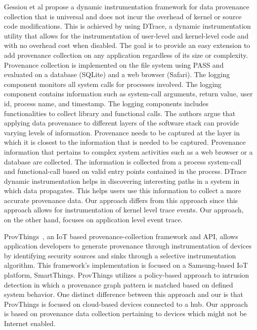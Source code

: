 

Gessiou et al \cite{gessiou_towards_2012} propose a dynamic instrumentation framework for data provenance collection that is universal and does not incur the overhead of kernel or source code modifications. This is achieved by using DTrace, a dynamic instrumentation utility that allows for the instrumentation of user-level and kernel-level code and with no overhead cost when disabled. The goal is to provide an easy extension to add provenance collection on any application regardless of its size or complexity. Provenance collection is implemented on the file system using PASS and evaluated on a database (SQLite) and a web browser (Safari). 
The logging component monitors all system calls for processes involved. The logging component contains information such as system-call arguments, return value, user id, process name, and timestamp. The logging components includes functionalities to collect library and functional calls. The authors argue that applying data provenance to different layers of the software stack can provide varying levels of information. Provenance needs to be captured at the layer in which it is closest to the information that is needed to be captured. Provenance information that pertains to complex system activities such as a web browser or a database are collected. The information is collected from a process system-call and functional-call based on valid entry points contained in the process. DTrace dynamic instrumentation helps in discovering interesting paths in a system in which data propagates. This helps users use this information to collect a more accurate provenance data. Our approach differs from this approach since this approach allows for instrumentation of kernel level trace events. Our approach, on the other hand, focuses on application level event trace.


ProvThings~\cite{Wang2017FearAL}, an IoT based provenance-collection framework and API, allows application developers to generate provenance through instrumentation of devices by identifying security sources and sinks through a selective instrumentation algorithm. This framework's implementation is focused on a Samsung-based IoT platform, SmartThings. ProvThings utilizes a policy-based approach to intrusion detection in which a provenance graph pattern is matched based on defined system behavior. One distinct difference between this approach and our is that ProvThings is focused on cloud-based devices connected to a hub. Our approach is based on provenance data collection pertaining to devices which might not be Internet enabled.

